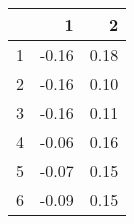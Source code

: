 \begin{table}[ht]
\begin{center}
\begin{tabular}{rrr}
  \hline
 & 1 & 2 \\ 
  \hline
1 & -0.16 & 0.18 \\ 
  2 & -0.16 & 0.10 \\ 
  3 & -0.16 & 0.11 \\ 
  4 & -0.06 & 0.16 \\ 
  5 & -0.07 & 0.15 \\ 
  6 & -0.09 & 0.15 \\ 
   \hline
\end{tabular}
\end{center}
\end{table}
